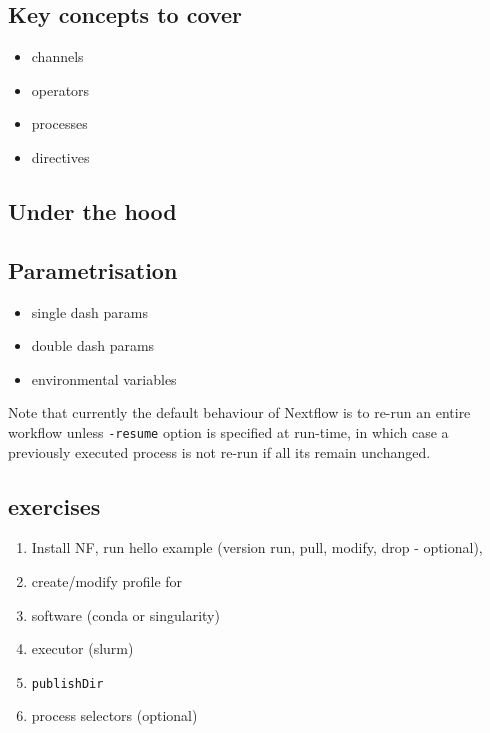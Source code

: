 \subsection{Key concepts to cover}



\begin{itemize}
 \item channels
 \item operators
 \item processes
 \item directives
\end{itemize}

\subsection {Under the hood}



\subsection{Parametrisation}

\begin{itemize}
 \item single dash params
 \item double dash params
 \item environmental variables
\end{itemize}

\begin{note}
Note that currently the default behaviour of Nextflow is to re-run an entire workflow 
unless \texttt{-resume} option is specified at run-time, in which case a previously 
executed process is not re-run if all its remain unchanged.

\end{note}


\subsection{exercises}

\begin{enumerate}
 \item Install NF, run hello example (version run, pull, modify, drop - optional), 
 \item create/modify profile for 
  \item software (conda or singularity)
  \item executor (slurm)
 \item \texttt{publishDir}
 \item process selectors (optional)
\end{enumerate}


